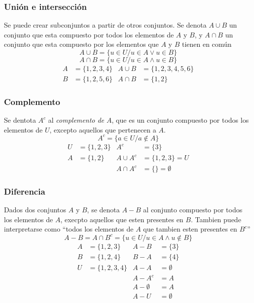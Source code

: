 \documentclass[../teoria.root.tex]{subfiles}
\begin{document}
\subsubsection{Unión e intersección}
Se puede crear subconjuntos a partir de otros conjuntos.
Se denota $A \cup B$ un conjunto que esta compuesto por todos los elementos de $A$ y $B$,
y $A \cap B$ un conjunto que esta compuesto por los elementos que $A$ y $B$ tienen en común
\[ A \cup B = \{ u \in U / u \in A \lor u \in B \} \]
\[ A \cap B = \{ u \in U / u \in A \land u \in B \} \]
\begin{align*}
    A & =  \{ 1, 2, 3, 4 \} & A \cup B & = \{ 1, 2, 3, 4, 5, 6 \} \\
    B & =\{ 1, 2, 5, 6 \}   & A \cap B & = \{ 1, 2 \}
\end{align*}

\subsubsection{Complemento}
Se dentota $A^c$ al \textit{complemento de $A$}, que es un conjunto compuesto por
todos los elementos de $U$, excepto aquellos que pertenecen a $A$.
\[ A^c = \{ a \in U / a \notin A \} \]
\begin{align*}
    U & =  \{1, 2, 3\} & A^c        & = \{3\}            \\
    A & = \{1, 2\}     & A \cup A^c & = \{1, 2, 3\} = U  \\
      &                & A \cap A^c & = \{\} = \emptyset
\end{align*}

\subsubsection{Diferencia}
Dados dos conjuntos $A$ y $B$, se denota $A - B$ al conjunto compuesto por todos
los elementos de $A$, execpto aquellos que esten presentes en $B$. Tambien puede
interpretarse como ``todos los elementos de $A$ que tambien esten presentes en $B^c$''
\[ A - B = A \cap B^c = \{ u \in U / u \in A \land u \notin B \} \]
\begin{align*}
    A & = \{1, 2, 3\}    & A - B         & = \{3\}     \\
    B & = \{1, 2, 4\}    & B - A         & = \{4\}     \\
    U & = \{1, 2, 3, 4\} & A - A         & = \emptyset \\
      &                  & A - A^c       & = A         \\
      &                  & A - \emptyset & = A         \\
      &                  & A - U         & = \emptyset
\end{align*}
\end{document}
